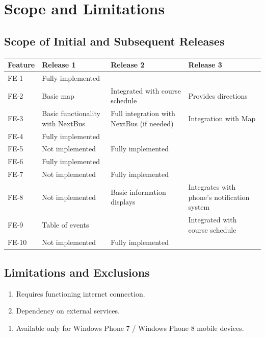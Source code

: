 \documentclass[pdftex,12pt,letter]{article}
\begin{document}
\section{Scope and Limitations}
\subsection{Scope of Initial and Subsequent Releases}
\begin{table}[h]
\begin{tabularx}{\textwidth }[t]{|l|Y|Y|Y|}
\hline
\bfseries Feature & \bfseries\hspace{1cm}Release 1 & \bfseries\hspace{1cm}Release 2 & \bfseries\hspace{1cm}Release 3 \\ \hline
FE-1 & Fully implemented & ~ & ~ \\ \hline
FE-2 & Basic map & Integrated with course schedule & Provides directions \\ \hline
FE-3 & Basic functionality with NextBus & Full integration with NextBus (if needed) & Integration with Map \\ \hline
FE-4 & Fully implemented & ~ & ~ \\ \hline
FE-5 & Not implemented & Fully implemented & ~ \\ \hline
FE-6 & Fully implemented & ~ & ~ \\ \hline
FE-7 & Not implemented & Fully implemented & ~ \\ \hline
FE-8 & Not implemented & Basic information displays & Integrates with phone's notification system \\ \hline
FE-9 & Table of events & ~ & Integrated with course schedule \\ \hline
FE-10 & Not implemented & Fully implemented & ~ \\
\hline
\end{tabularx}
\end{table}
\subsection{Limitations and Exclusions}
\begin{enumerate}[L{I}-1:]
\item Requires functioning internet connection.
\item Dependency on external services.
\end{enumerate}
\begin{enumerate}[EX-1:]
\item Available only for Windows Phone 7 / Windows Phone 8 mobile devices.
\end{enumerate}
\end{document}
